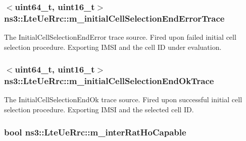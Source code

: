 \subsubsection[{\texorpdfstring{m\+\_\+initial\+Cell\+Selection\+End\+Error\+Trace}{m_initialCellSelectionEndErrorTrace}}]{$<$uint64\+\_\+t, uint16\+\_\+t$>$ ns3\+::\+Lte\+Ue\+Rrc\+::m\+\_\+initial\+Cell\+Selection\+End\+Error\+Trace\hspace{0.3cm}{\ttfamily [private]}}\hypertarget{classns3_1_1LteUeRrc_a32e24fd29de39fe7397235348e6a32d7}{}\label{classns3_1_1LteUeRrc_a32e24fd29de39fe7397235348e6a32d7}
The {\ttfamily Initial\+Cell\+Selection\+End\+Error} trace source. Fired upon failed initial cell selection procedure. Exporting I\+M\+SI and the cell ID under evaluation. 
\subsubsection[{\texorpdfstring{m\+\_\+initial\+Cell\+Selection\+End\+Ok\+Trace}{m_initialCellSelectionEndOkTrace}}]{$<$uint64\+\_\+t, uint16\+\_\+t$>$ ns3\+::\+Lte\+Ue\+Rrc\+::m\+\_\+initial\+Cell\+Selection\+End\+Ok\+Trace\hspace{0.3cm}{\ttfamily [private]}}\hypertarget{classns3_1_1LteUeRrc_a84f159549c4095a94197657e51215062}{}\label{classns3_1_1LteUeRrc_a84f159549c4095a94197657e51215062}
The {\ttfamily Initial\+Cell\+Selection\+End\+Ok} trace source. Fired upon successful initial cell selection procedure. Exporting I\+M\+SI and the selected cell ID. 
\subsubsection[{\texorpdfstring{m\+\_\+inter\+Rat\+Ho\+Capable}{m_interRatHoCapable}}]{\setlength{\rightskip}{0pt plus 5cm}bool ns3\+::\+Lte\+Ue\+Rrc\+::m\+\_\+inter\+Rat\+Ho\+Capable\hspace{0.3cm}{\ttfamily [private]}}\hypertarget{classns3_1_1LteUeRrc_a0702e1a453de2d8f1c454fea344ef4f0}{}\label{classns3_1_1LteUeRrc_a0702e1a453de2d8f1c454fea344ef4f0}
